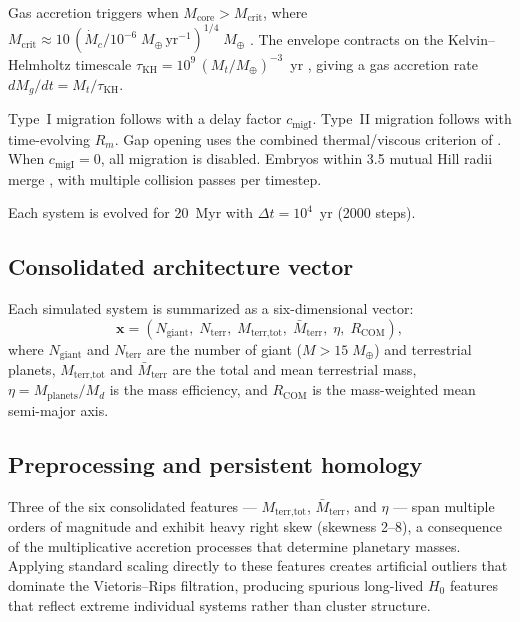\documentclass[twocolumn]{aastex631}
\newcommand{\Mearth}{M_\oplus}
\newcommand{\tauKH}{\tau_\mathrm{KH}}
\newcommand{\Mcrit}{M_\mathrm{crit}}
\newcommand{\cmigi}{c_\mathrm{migI}}
\newcommand{\Rcom}{R_\mathrm{COM}}
\begin{document}
Gas accretion triggers when $M_\text{core} > \Mcrit$, where
$\Mcrit \approx 10\,({\dot{M}_c}/{10^{-6}\;\Mearth\,\text{yr}^{-1}})^{1/4}
\;\Mearth$ \citep{IdaLin2004a, Ikoma2000}.  The envelope contracts on the
Kelvin--Helmholtz timescale $\tauKH = 10^9\,(M_t/\Mearth)^{-3}$~yr
\citep{IdaLin2004a}, giving a gas accretion rate $dM_g/dt = M_t/\tauKH$.

Type~I migration follows \citet{Tanaka2002} with a delay factor $\cmigi$.
Type~II migration follows \citet{IdaLin2004a} with time-evolving $R_m$.  Gap
opening uses the combined thermal/viscous criterion of \citet{Crida2006}.
When $\cmigi = 0$, all migration is disabled.  Embryos within 3.5 mutual Hill
radii merge \citep{Chambers2006}, with multiple collision passes per timestep.

Each system is evolved for 20~Myr with $\Delta t = 10^4$~yr (2000 steps).

\subsection{Consolidated architecture vector}
\label{sec:consolidated}

Each simulated system is summarized as a six-dimensional vector:
\begin{equation}
\mathbf{x} = (N_\text{giant},\;N_\text{terr},\;M_\text{terr,tot},\;
\bar{M}_\text{terr},\;\eta,\;\Rcom),
\label{eq:consolidated}
\end{equation}
where $N_\text{giant}$ and $N_\text{terr}$ are the number of giant
($M > 15\;\Mearth$) and terrestrial planets, $M_\text{terr,tot}$ and
$\bar{M}_\text{terr}$ are the total and mean terrestrial mass, $\eta =
M_\text{planets}/M_d$ is the mass efficiency, and $\Rcom$ is the
mass-weighted mean semi-major axis.

\subsection{Preprocessing and persistent homology}
\label{sec:persistence}

Three of the six consolidated features --- $M_\text{terr,tot}$,
$\bar{M}_\text{terr}$, and $\eta$ --- span multiple orders of magnitude and
exhibit heavy right skew (skewness 2--8), a consequence of the multiplicative
accretion processes that determine planetary masses.  Applying standard
scaling directly to these features creates artificial outliers that dominate
the Vietoris--Rips filtration, producing spurious long-lived $H_0$ features
that reflect extreme individual systems rather than cluster structure.
\end{document}
